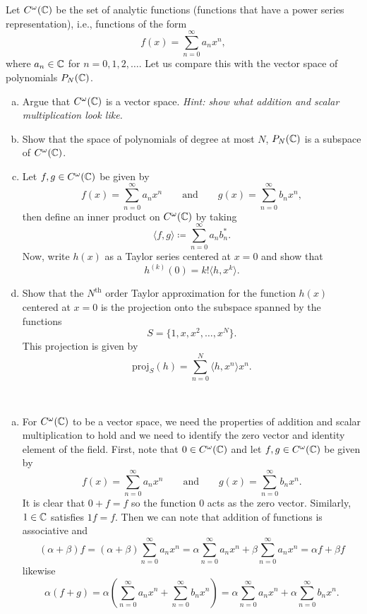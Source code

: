 \documentclass[12pt]{article} %
\begin{document}
\begin{problem}
Let $C^\omega(\mathbb{C})$ be the set of analytic functions (functions that have a power series representation), i.e., functions of the form
\[
f(x) = \sum_{n=0}^\infty a_n x^n,
\]
where $a_n\in \mathbb{C}$ for $n=0,1,2,\dots$. Let us compare this with the vector space of polynomials $P_N(\mathbb{C})$.
\begin{enumerate}[(a)]
    \item Argue that $C^\omega(\mathbb{C})$ is a vector space. \emph{Hint: show what addition and scalar multiplication look like.}
    \item Show that the space of polynomials of degree at most $N$, $P_N(\mathbb{C})$ is a subspace of $C^\omega(\mathbb{C})$.
    \item Let $f,g\in C^\omega(\mathbb{C})$ be given by
    \[
        f(x)=\sum_{n=0}^\infty a_n x^n \qquad \textrm{and} \qquad g(x) = \sum_{n=0}^\infty b_n x^n,
    \]
    then define an inner product on $C^\omega(\mathbb{C})$ by taking
    \[
    \langle f,g\rangle \coloneqq \sum_{n=0}^\infty a_n b_n^*.
    \]
    Now, write $h(x)$ as a Taylor series centered at $x=0$ and show that
    \[
    h^{(k)}(0) = k!\langle h,x^k \rangle.
    \]
    \item Show that the $N^\textrm{th}$ order Taylor approximation for the function $h(x)$ centered at $x=0$ is the projection onto the subspace spanned by the functions
    \[
    S=\{1,x,x^2,\dots,x^N\}.
    \]
    This projection is given by
    \[
    \textrm{proj}_S(h) = \sum_{n=0}^N \langle h, x^n \rangle x^n.
    \]
\end{enumerate}
\begin{solution}~
\begin{enumerate}[(a)]
    \item For $C^\omega(\mathbb{C})$ to be a vector space, we need the properties of addition and scalar multiplication to hold and we need to identify the zero vector and identity element of the field. First, note that $0\in C^\omega(\mathbb{C})$ and let $f,g \in C^\omega(\mathbb{C})$ be given by
    \[
        f(x) = \sum_{n=0}^\infty a_n x^n \qquad \textrm{and} \qquad g(x) = \sum_{n=0}^\infty b_n x^n.
    \]
    It is clear that $0+f= f$ so the function $0$ acts as the zero vector. Similarly, $1\in \mathbb{C}$ satisfies $1f = f$. Then we can note that addition of functions is associative and
    \[
    (\alpha + \beta)f = (\alpha + \beta) \sum_{n=0}^\infty a_n x^n = \alpha \sum_{n=0}^\infty  a_n x^n + \beta\sum_{n=0}^\infty  a_n x^n = \alpha f + \beta f
    \]
    likewise
    \[
    \alpha(f+g) = \alpha \left(\sum_{n=0}^\infty a_n x^n + \sum_{n=0}^\infty b_n x^n\right) = \alpha \sum_{n=0}^\infty a_n x^n + \alpha \sum_{n=0}^\infty b_n x^n.
\]
\end{enumerate}
\end{solution}
\end{problem}
\end{document}
